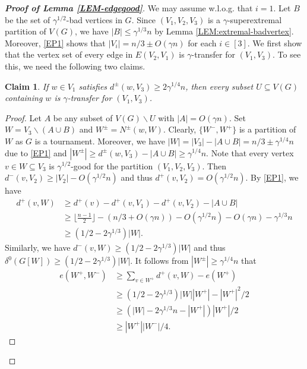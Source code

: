 \documentclass[11pt,a4paper,reqno]{amsart}
\newtheorem{claim}{Claim}
\theoremstyle{definition} %
\begin{document}
 \begin{proof}[\textbf{Proof of Lemma \ref{LEM-edgegood}}]

 We may  assume w.l.o.g. that $i=1$. Let $B$ be the set of $\gamma^{1/2}$-bad vertices in $G$. Since $(V_1, V_2, V_3)$ is a $\gamma$-superextremal partition of $V(G)$, we have $|B|\leqslant \gamma^{1/3}n$ by Lemma \ref{LEM:extremal-badvertex}. Moreover, \ref{EP1} shows that $|V_i|=n/3\pm O(\gamma n)$ for each $i\in[3]$. We first show that the vertex set of every edge  in $E(V_2,V_1)$ is $\gamma$-transfer for $(V_1,V_3)$. To see this, we need the following two claims.

\begin{claim}\label{CLAIM:(i,j)-set}
If $w \in V_1$ satisfies $d^{\pm}(w, V_3) \geqslant 2\gamma^{1/4}n$, then every subset $U\subseteq V(G)$ containing $w$ is $\gamma$-transfer for $(V_1,V_3)$.
\end{claim}


\begin{proof}
Let $A$ be any subset of $V(G)\backslash U$ with $|A|=O(\gamma n)$.  Set $W=V_3\backslash(A\cup B)$ and $W^\pm=N^\pm(w,W)$. Clearly, $\{W^-,W^+\}$ is a partition of $W$ as $G$ is a tournament. Moreover, we have  $|W|= |V_3|-|A\cup B|= n/3\pm\gamma^{1/4}n$ due to \ref{EP1} and $|W^\pm|\geqslant d^{\pm}(w,V_3)-|A\cup B|\geqslant\gamma^{1/4}n$.  Note that every vertex $v\in W\subseteq V_3$ is $\gamma^{1/2}$-good for the partition $(V_1,V_2,V_3)$. Then $d^-(v,V_2)\geqslant|V_2|-O(\gamma^{1/2}n)$ and thus $d^+(v,V_2)=O(\gamma^{1/2}n)$.  By \ref{EP1}, we have 
\begin{align*}
    d^+(v,W)&\geqslant d^+(v)-d^+(v,V_1)-d^+(v,V_2)-|A\cup B|\\
    &\geqslant\lfloor\frac{n-1}{2}\rfloor-(n/3+O(\gamma n))-O(\gamma^{1/2}n)-O(\gamma n)-\gamma^{1/3}n\\
    &\geqslant(1/2-2\gamma^{1/3})|W|.
\end{align*}
Similarly, we have  $d^-(v,W)\geqslant(1/2-2\gamma^{1/3})|W|$ and thus $\delta^0(G[W])\geqslant(1/2-2\gamma^{1/3})|W|$. It follows from $|W^\pm|\geqslant \gamma^{1/4} n$ that 
\begin{align*}
e(W^+,W^-)&\geqslant\sum_{v\in W^+}d^+(v,W)-e(W^+)\\
&\geqslant (1/2-2\gamma^{1/3})|W||W^+|-|W^+|^2/2\\
&\geqslant (|W|-2\gamma^{1/3}n -|W^+|)|W^+|/2\\
&\geqslant |W^+||W^-|/4.
\end{align*}
 

\end{proof}
\end{proof}
\end{document}
